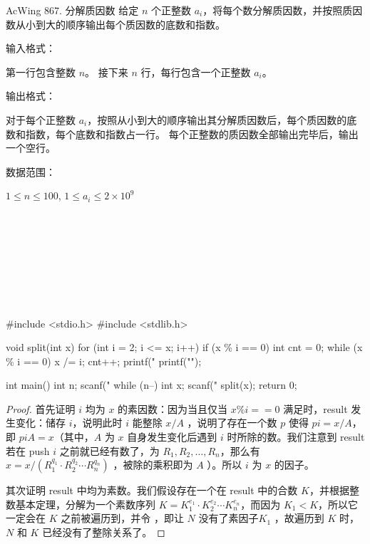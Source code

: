 \begin{titledbox}{AcWing 867. 分解质因数}
    给定 $n$ 个正整数 $a_i$，将每个数分解质因数，并按照质因数从小到大的顺序输出每个质因数的底数和指数。

    输入格式：

    第一行包含整数 $n$。 接下来 $n$ 行，每行包含一个正整数 $a_i$。

    输出格式：

    对于每个正整数 $a_i$，按照从小到大的顺序输出其分解质因数后，每个质因数的底数和指数，每个底数和指数占一行。 每个正整数的质因数全部输出完毕后，输出一个空行。

    数据范围：

    $1 \le n \le 100$, $1 \le a_i \le 2 \times 10^9$

    \begin{inputblock}
         \\
         \\
    \end{inputblock}
    \begin{outputblock}
         \\
         \\
        \\
         \\

    \end{outputblock}
\end{titledbox}

\begin{mycpptwocol}[试除法分解质因数]
    #include <stdio.h>
    #include <stdlib.h>

    void split(int x) {
        for (int i = 2; i <= x; i++) {
            if (x \% i == 0) {
                int cnt = 0;
                while (x \% i == 0) {
                    x /= i;
                    cnt++;
                }
                printf("%
            }
        }
        printf("\n");
    }

    int main() {
        int n;
        scanf("%
        while (n--) {
            int x;
            scanf("%
            split(x);
        }
        return 0;
    }
\end{mycpptwocol}

\begin{proof}
    首先证明 $i$ 均为 $x$ 的素因数：因为当且仅当 $x \% i == 0$ 满足时，result 发生变化：储存 $i$，说明此时 $i$ 能整除 $x / A$ ，说明了存在一个数 $p$ 使得 $pi = x / A$，即 $piA = x$（其中，$A$ 为 $x$ 自身发生变化后遇到 $i$ 时所除的数。我们注意到 result 若在 push $i$ 之前就已经有数了，为 $R_1, R_2, \dots, R_n$，那么有 $x = x / (R_1^{q_1}\cdot R_2^{q_2}\cdots R_n^{q_n})$ ，被除的乘积即为 $A$ ）。所以 $i$ 为 $x$ 的因子。

    其次证明 result 中均为素数。我们假设存在一个在 result 中的合数 $K$，并根据整数基本定理，分解为一个素数序列 $K = K_1^{e_1}\cdot K_2^{e_2}\cdots K_n^{e_n}$，而因为 $K_1 < K$，所以它一定会在 $K$ 之前被遍历到，并令 ，即让 $N$ 没有了素因子$K_1$ ，故遍历到 $K$ 时，$N$ 和 $K$ 已经没有了整除关系了。
\end{proof}

